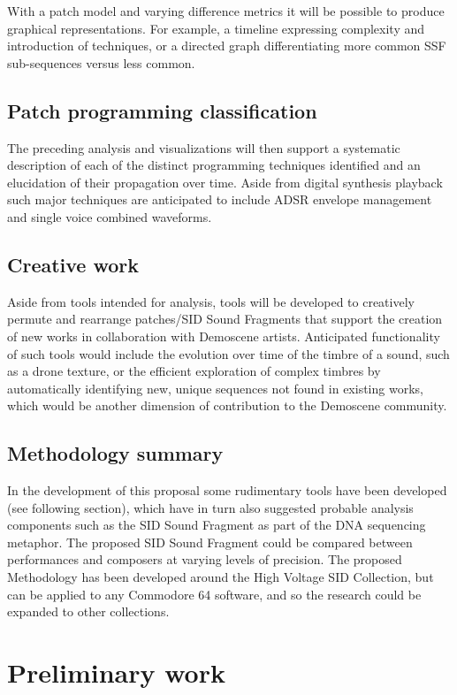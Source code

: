 \documentclass[10pt]{article}
\begin{document}
\begin{multicols*}{2}
With a patch model and varying difference metrics it will be possible to produce graphical representations. For example, a timeline expressing complexity and introduction of techniques, or a directed graph differentiating more common SSF sub-sequences versus less common.

\subsection{Patch programming classification}

The preceding analysis and visualizations will then support a systematic description of each of the distinct programming techniques identified and an elucidation of their propagation over time. Aside from digital synthesis playback such major techniques are anticipated to include ADSR envelope management and single voice combined waveforms.

\subsection{Creative work}

Aside from tools intended for analysis, tools will be developed to creatively permute and rearrange patches/SID Sound Fragments that support the creation of new works in collaboration with Demoscene artists. Anticipated functionality of such tools would include the evolution over time of the timbre of a sound, such as a drone texture, or the efficient exploration of complex timbres by automatically identifying new, unique sequences not found in existing works, which would be another dimension of contribution to the Demoscene community.

\subsection{Methodology summary}

In the development of this proposal some rudimentary tools have been developed (see following section), which have in turn also suggested probable analysis components such as the SID Sound Fragment as part of the DNA sequencing metaphor. The proposed SID Sound Fragment could be compared between performances and composers at varying levels of precision. The proposed Methodology has been developed around the High Voltage SID Collection, but can be applied to any Commodore 64 software, and so the research could be expanded to other collections.

\section{Preliminary work}
\label{prelim}


\end{multicols*}
\end{document}
